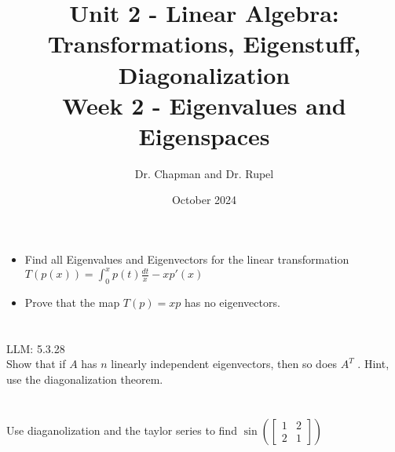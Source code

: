 \documentclass{article}
\title{Unit 2 - Linear Algebra: Transformations, Eigenstuff, Diagonalization \\ Week 2 - Eigenvalues and Eigenspaces}
\author{Dr. Chapman and Dr. Rupel}
\date{October 2024}
\begin{document}
\maketitle
\section{}
\begin{itemize}
\item Find all Eigenvalues and Eigenvectors for the linear transformation $T(p(x))=\int^{x}_{0}p(t)\frac{dt}{x}-xp'(x)$
\item Prove that the map $T(p)=xp$ has no eigenvectors.
\end{itemize}
\section{}
LLM: 5.3.28\\
Show that if $A$ has $n$ linearly independent eigenvectors, then so does $A^T$ . Hint, use the diagonalization theorem.
\section{}
Use diaganolization and the taylor series to find $\sin \left( \begin{bmatrix} 1 & 2\\ 2 & 1 \end{bmatrix} \right)$
\end{document}
